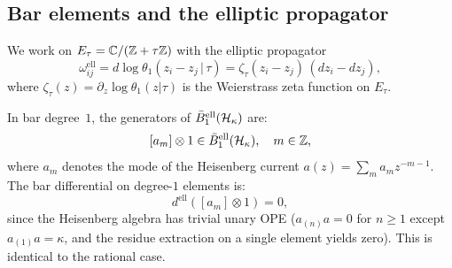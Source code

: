 \subsection{Bar elements and the elliptic propagator}
\label{subsec:elliptic-bar-elements}

We work on $E_\tau = \mathbb{C} / (\mathbb{Z} + \tau\mathbb{Z})$ with the elliptic
propagator
\begin{equation}\label{eq:ell-propagator}
\omega_{ij}^{\mathrm{ell}}
= d\log\theta_1(z_i - z_j \,|\, \tau)
= \zeta_\tau(z_i - z_j)\,(dz_i - dz_j),
\end{equation}
where $\zeta_\tau(z) = \partial_z \log\theta_1(z|\tau)$ is the
Weierstrass zeta function on $E_\tau$.

\begin{computation}\label{comp:ell-bar-deg1}
In bar degree~$1$, the generators of $\bar{B}^{\mathrm{ell}}_1(\mathcal{H}_\kappa)$
are:
\[
[a_m] \otimes 1 \in \bar{B}^{\mathrm{ell}}_1(\mathcal{H}_\kappa), \quad m \in \mathbb{Z},
\]
where $a_m$ denotes the mode of the Heisenberg current $a(z) = \sum_m a_m z^{-m-1}$.
The bar differential on degree-$1$ elements is:
\[
d^{\mathrm{ell}}([a_m] \otimes 1) = 0,
\]
since the Heisenberg algebra has trivial unary OPE
($a_{(n)}a = 0$ for $n \geq 1$ except $a_{(1)}a = \kappa$, and
the residue extraction on a single element yields zero).
This is identical to the rational case.
\end{computation}

